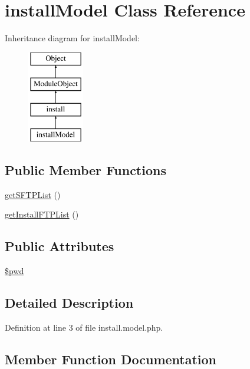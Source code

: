 \hypertarget{classinstallModel}{}\section{install\+Model Class Reference}
\label{classinstallModel}
Inheritance diagram for install\+Model\+:\begin{figure}[H]
\begin{center}
\leavevmode
\includegraphics[height=4.000000cm]{classinstallModel}
\end{center}
\end{figure}
\subsection*{Public Member Functions}
\begin{DoxyCompactItemize}
\item 
\hyperlink{classinstallModel_acf556177e975e834524be848f14d5348}{get\+S\+F\+T\+P\+List} ()
\item 
\hyperlink{classinstallModel_a684579a29ff70929baa4ac64012f0bdf}{get\+Install\+F\+T\+P\+List} ()
\end{DoxyCompactItemize}
\subsection*{Public Attributes}
\begin{DoxyCompactItemize}
\item 
\hyperlink{classinstallModel_ae8a1df73f1708ec17897f21a40ab6c15}{\$pwd}
\end{DoxyCompactItemize}


\subsection{Detailed Description}


Definition at line 3 of file install.\+model.\+php.



\subsection{Member Function Documentation}
\mbox{\label{classinstallModel_a684579a29ff70929baa4ac64012f0bdf}} 
